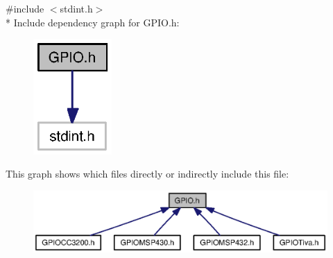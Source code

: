 {\ttfamily \#include $<$stdint.\+h$>$}\\*
Include dependency graph for G\+P\+I\+O.\+h\+:
\nopagebreak
\begin{figure}[H]
\begin{center}
\leavevmode
\includegraphics[width=85pt]{_g_p_i_o_8h__incl}
\end{center}
\end{figure}
This graph shows which files directly or indirectly include this file\+:
\nopagebreak
\begin{figure}[H]
\begin{center}
\leavevmode
\includegraphics[width=350pt]{_g_p_i_o_8h__dep__incl}
\end{center}
\end{figure}
